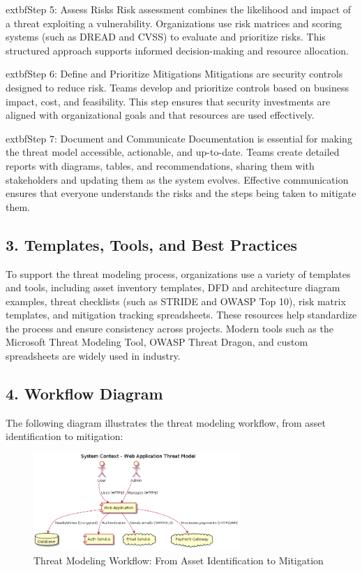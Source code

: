 	extbf{Step 5: Assess Risks}
Risk assessment combines the likelihood and impact of a threat exploiting a vulnerability\cite{uceda2015}. Organizations use risk matrices and scoring systems (such as DREAD and CVSS) to evaluate and prioritize risks. This structured approach supports informed decision-making and resource allocation.

	extbf{Step 6: Define and Prioritize Mitigations}
Mitigations are security controls designed to reduce risk\cite{owasp}. Teams develop and prioritize controls based on business impact, cost, and feasibility. This step ensures that security investments are aligned with organizational goals and that resources are used effectively.

	extbf{Step 7: Document and Communicate}
Documentation is essential for making the threat model accessible, actionable, and up-to-date\cite{shostack2014}. Teams create detailed reports with diagrams, tables, and recommendations, sharing them with stakeholders and updating them as the system evolves. Effective communication ensures that everyone understands the risks and the steps being taken to mitigate them.

\subsection*{3. Templates, Tools, and Best Practices}
To support the threat modeling process, organizations use a variety of templates and tools, including asset inventory templates, DFD and architecture diagram examples, threat checklists (such as STRIDE and OWASP Top 10), risk matrix templates, and mitigation tracking spreadsheets. These resources help standardize the process and ensure consistency across projects. Modern tools such as the Microsoft Threat Modeling Tool, OWASP Threat Dragon, and custom spreadsheets are widely used in industry.

\subsection*{4. Workflow Diagram}
The following diagram illustrates the threat modeling workflow, from asset identification to mitigation:
\begin{figure}[H]
	\centering
	\includegraphics[width=0.7\textwidth]{images/system-context}
	\caption{Threat Modeling Workflow: From Asset Identification to Mitigation\cite{shostack2014}}
\end{figure}

